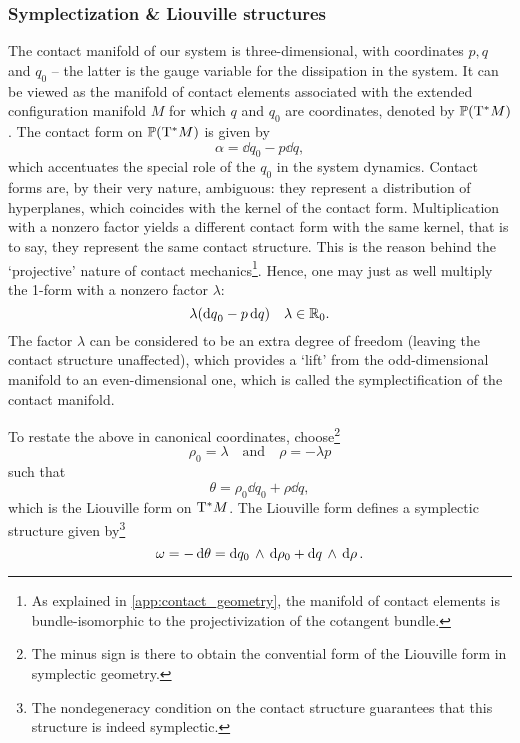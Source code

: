 \subsubsection{Symplectization \& Liouville structures}
The contact manifold of our system is three-dimensional, with coordinates $p, q$ and $q_0$ -- the latter is the gauge variable for the dissipation in the system. It can be viewed as the manifold of contact elements associated with the extended configuration manifold $M$ for which $q$ and $q_0$ are coordinates, denoted by $\mathbb{P}\qty(\mathrm{T}^*M)$. The contact form on $\mathbb{P}\qty(\mathrm{T}^*M)$ is given by 
\begin{equation}
    \alpha = \dd{q}_0 - p\dd{q},
    \label{eq:dho_contact_form}
\end{equation}
which accentuates the special role of the $q_0$ in the system dynamics. Contact forms are, by their very nature, ambiguous: they represent a distribution of hyperplanes, which coincides with the kernel of the contact form. Multiplication with a nonzero factor yields a different contact form with the same kernel, that is to say, they represent the same contact structure. This is the reason behind the `projective' nature of contact mechanics\footnote{As explained in \cref{app:contact_geometry}, the manifold of contact elements is bundle-isomorphic to the projectivization of the cotangent bundle.}. Hence, one may just as well multiply the 1-form with a nonzero factor $\lambda$:
$$ \lambda\qty(\dd{q}_0 - p\dd{q}) \quad \lambda \in \mathbb{R}_0. $$
The factor $\lambda$ can be considered to be an extra degree of freedom (leaving the contact structure unaffected), which provides a `lift' from the odd-dimensional manifold to an even-dimensional one, which is called the symplectification of the contact manifold. \cite{Arnold1989}

To restate the above in canonical coordinates, choose\footnote
{The minus sign is there to obtain the convential form of the Liouville form in symplectic geometry.}
\begin{equation}
    \rho_0 = \lambda \quad \text{and} \quad \rho = -\lambda p
    \label{eq:homo_coords}
\end{equation}
such that
\begin{equation} 
    \theta = \rho_0\dd{q}_0 + \rho\dd{q}, 
    \label{eq:dho_liouville_form}
\end{equation}
which is the Liouville form on $\mathrm{T}^*M$. \cite[p. 308]{Libermann1987}  The Liouville form defines a symplectic structure given by\footnote
{The nondegeneracy condition on the contact structure guarantees that this structure is indeed symplectic.}
$$\omega = -\dd{\theta} =  \dd{q_0}\,\wedge\,\dd{\rho_0}  +  \dd{q}\,\wedge\,\dd{\rho} .$$ 

